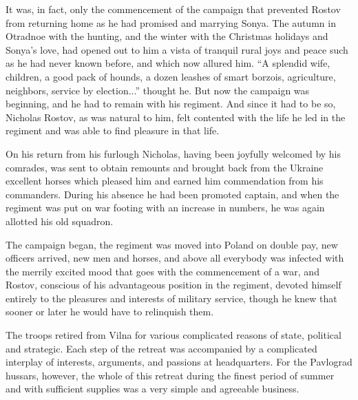 It was, in fact, only the commencement of the campaign that
prevented Rostov from returning home as he had promised and
marrying Sonya. The autumn in Otradnoe with the hunting, and the
winter with the Christmas holidays and Sonya's love, had opened
out to him a vista of tranquil rural joys and peace such as he
had never known before, and which now allured him. ``A splendid
wife, children, a good pack of hounds, a dozen leashes of smart
borzois, agriculture, neighbors, service by election...'' thought
he. But now the campaign was beginning, and he had to remain with
his regiment. And since it had to be so, Nicholas Rostov, as was
natural to him, felt contented with the life he led in the
regiment and was able to find pleasure in that life.

On his return from his furlough Nicholas, having been joyfully
welcomed by his comrades, was sent to obtain remounts and brought
back from the Ukraine excellent horses which pleased him and
earned him commendation from his commanders. During his absence
he had been promoted captain, and when the regiment was put on
war footing with an increase in numbers, he was again allotted
his old squadron.

The campaign began, the regiment was moved into Poland on double
pay, new officers arrived, new men and horses, and above all
everybody was infected with the merrily excited mood that goes
with the commencement of a war, and Rostov, conscious of his
advantageous position in the regiment, devoted himself entirely
to the pleasures and interests of military service, though he
knew that sooner or later he would have to relinquish them.

The troops retired from Vilna for various complicated reasons of
state, political and strategic. Each step of the retreat was
accompanied by a complicated interplay of interests, arguments,
and passions at headquarters. For the Pavlograd hussars, however,
the whole of this retreat during the finest period of summer and
with sufficient supplies was a very simple and agreeable
business.

